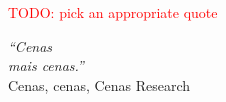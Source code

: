 \cleardoublepage
\thispagestyle{plain}

\vspace*{8cm}

\textcolor{red}{TODO: pick an appropriate quote}

\begin{flushright}
  \textsl{``Cenas\\mais cenas.''}\\
\vspace*{1.5cm}
    Cenas, cenas, Cenas Research
\end{flushright}





